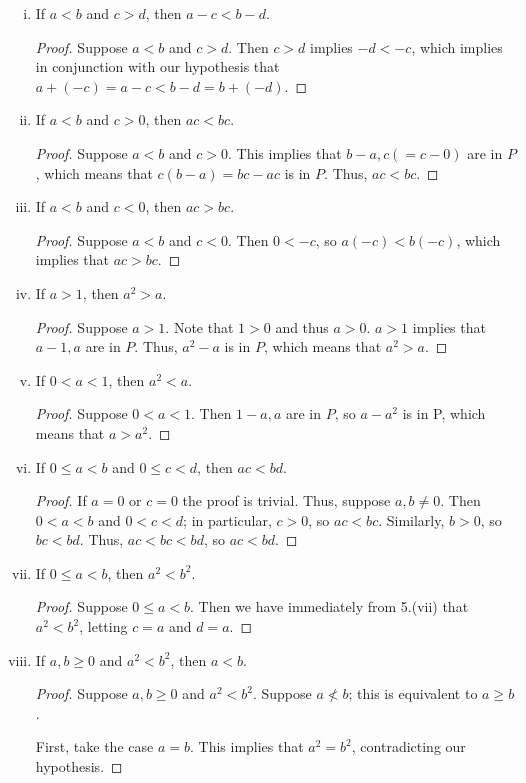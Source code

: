 \documentclass{amsart}
\begin{document}
\begin{enumerate}[1.]
\begin{enumerate}[(i)]
    \item If $a<b$ and $c>d$, then $a-c<b-d$.
\begin{proof}
      Suppose $a<b$ and $ c>d$. Then $c>d$ implies $-d<-c$, which implies in conjunction with our hypothesis that $a+(-c)=a-c<b-d=b+(-d)$.
    \end{proof}
  \item If $a<b$ and $c>0$, then $ac<bc$.
    \begin{proof}
      Suppose $a<b$ and $c>0$. This implies that $b-a, c(=c-0)$ are in $P$, which means that $c(b-a)=bc-ac$ is in $P$. Thus, $ac<bc$.
    \end{proof}
  \item If $a<b$ and $c<0$, then $ac>bc$.
    \begin{proof}
      Suppose $a<b$ and $c<0$. Then $0<-c$, so $a(-c)<b(-c)$, which implies that $ac>bc$.
    \end{proof}
  \item If $a>1$, then $a^{2}>a$.
    \begin{proof}
      Suppose $a>1$. Note that $1>0$ and thus $a>0$. $a>1$ implies that $a-1, a$ are in $P$. Thus, $a^{2}-a$ is in $P$, which means that $a^{2}>a$.
    \end{proof}
  \item If $0<a<1$, then $a^{2}<a$.
    \begin{proof}
      Suppose $0<a<1$. Then $1-a, a$ are in $P$, so $a-a^{2}$ is in P, which means that $a>a^{2}$.
    \end{proof}
  \item If $0 \leq a<b$ and $0 \leq c<d$, then $ac<bd$.
    \begin{proof}
      If $a=0$ or $c=0$ the proof is trivial. Thus, suppose $a,b \neq 0$. Then $0<a<b$ and $0<c<d$; in particular, $c>0$, so $ac<bc$. Similarly, $b>0$, so $bc<bd$. Thus, $ac<bc<bd$, so $ac<bd$.
    \end{proof}
  \item If $0 \leq a<b$, then $a^{2}<b^{2}$.
    \begin{proof}
      Suppose $0 \leq a<b$. Then we have immediately from 5.(vii) that $a^{2}<b^{2}$, letting $c=a$ and $d=a$.
    \end{proof}
  \item If $a, b \geq 0$ and $a^{2}<b^{2}$, then $a<b$.
    \begin{proof}
    Suppose $a, b \geq 0$ and $a^{2}<b^{2}$. Suppose $a \not<b$; this is equivalent to $a \geq b$.

    First, take the case $a=b$. This implies that $a^{2}=b^{2}$, contradicting our hypothesis.


\end{proof}
\end{enumerate}
\end{enumerate}
\end{document}
